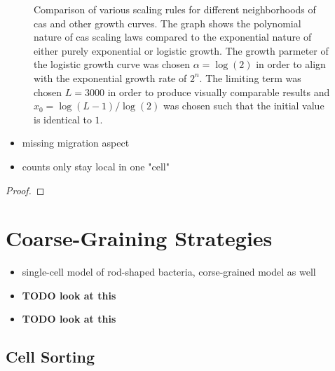 \begin{figure}[h]
\begin{minipage}{0.49\textwidth}
    \end{minipage}
    \caption{
        Comparison of various scaling rules for different neighborhoods of \acp{ca} and other
        growth curves.
        The graph shows the polynomial nature of \acp{ca} scaling laws compared to the exponential
        nature of either purely exponential or logistic growth.
        The growth parmeter of the logistic growth curve was chosen $\alpha=\log(2)$ in order to
        align with the exponential growth rate of $2^n$.
        The limiting term was chosen $L=3000$ in order to produce visually comparable results and
        $x_0=\log(L-1) / \log(2)$ was chosen such that the initial value is identical to $1$.
    }
    \label{fig:ca-scaling}
\end{figure}

\begin{theorem}
\end{theorem}

\begin{itemize}
    \item missing migration aspect
    \item counts only stay local in one "cell"
\end{itemize}
\begin{proof}
\end{proof}

\label{section:applications}


\section{Coarse-Graining Strategies}

\begin{itemize}
    \item \cite{You2018} single-cell model of rod-shaped bacteria, corse-grained model as well
    \item \cite{Wensink2012} \textbf{TODO look at this}
    \item \cite{Peruani2006} \textbf{TODO look at this}
\end{itemize}

\subsection{Cell Sorting}

